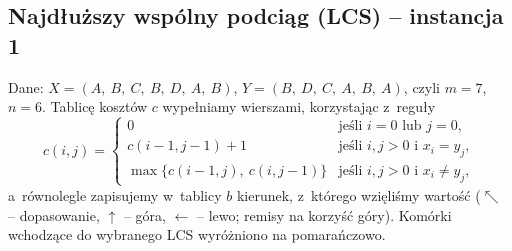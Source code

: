 \subsection{Najdłuższy wspólny podciąg (LCS) -- instancja 1}

Dane: $X = (A,\ B,\ C,\ B,\ D,\ A,\ B)$, $Y = (B,\ D,\ C,\ A,\ B,\ A)$, czyli
$m = 7$, $n = 6$. Tablicę kosztów $c$ wypełniamy wierszami, korzystając z~reguły
\[
	c(i, j) = \begin{cases}
		          0                               & \text{jeśli } i = 0 \text{ lub } j = 0,         \\
		          c(i - 1, j - 1) + 1             & \text{jeśli } i, j > 0 \text{ i } x_i = y_j,    \\
		          \max\{c(i - 1, j),\ c(i, j - 1)\} & \text{jeśli } i, j > 0 \text{ i } x_i \neq y_j,
	          \end{cases}
\]
a~równolegle zapisujemy w~tablicy $b$ kierunek, z~którego wzięliśmy wartość
($\nwarrow$ -- dopasowanie, $\uparrow$ -- góra, $\leftarrow$ -- lewo; remisy na
korzyść góry). Komórki wchodzące do wybranego LCS wyróżniono na
\textcolor{accentB}{pomarańczowo}.


